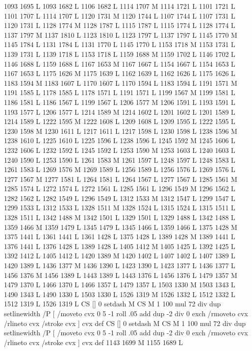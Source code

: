 {{{{{{{{{{{{{{{{{{{{{{{{1093 1695 L
1093 1682 L
1106 1682 L
1114 1707 M 1114 1721 L
1101 1721 L
1101 1707 L
1114 1707 L
1120 1731 M 1120 1744 L
1107 1744 L
1107 1731 L
1120 1731 L
1128 1774 M 1128 1787 L
1115 1787 L
1115 1774 L
1128 1774 L
1137 1797 M 1137 1810 L
1123 1810 L
1123 1797 L
1137 1797 L
1145 1770 M 1145 1784 L
1131 1784 L
1131 1770 L
1145 1770 L
1153 1718 M 1153 1731 L
1139 1731 L
1139 1718 L
1153 1718 L
1159 1688 M 1159 1702 L
1146 1702 L
1146 1688 L
1159 1688 L
1167 1653 M 1167 1667 L
1154 1667 L
1154 1653 L
1167 1653 L
1175 1626 M 1175 1639 L
1162 1639 L
1162 1626 L
1175 1626 L
1183 1594 M 1183 1607 L
1170 1607 L
1170 1594 L
1183 1594 L
1191 1571 M 1191 1585 L
1178 1585 L
1178 1571 L
1191 1571 L
1199 1567 M 1199 1581 L
1186 1581 L
1186 1567 L
1199 1567 L
1206 1577 M 1206 1591 L
1193 1591 L
1193 1577 L
1206 1577 L
1214 1589 M 1214 1602 L
1201 1602 L
1201 1589 L
1214 1589 L
1222 1595 M 1222 1608 L
1209 1608 L
1209 1595 L
1222 1595 L
1230 1598 M 1230 1611 L
1217 1611 L
1217 1598 L
1230 1598 L
1238 1596 M 1238 1610 L
1225 1610 L
1225 1596 L
1238 1596 L
1245 1592 M 1245 1606 L
1232 1606 L
1232 1592 L
1245 1592 L
1253 1590 M 1253 1603 L
1240 1603 L
1240 1590 L
1253 1590 L
1261 1583 M 1261 1597 L
1248 1597 L
1248 1583 L
1261 1583 L
1269 1576 M 1269 1589 L
1256 1589 L
1256 1576 L
1269 1576 L
1277 1567 M 1277 1581 L
1264 1581 L
1264 1567 L
1277 1567 L
1285 1561 M 1285 1574 L
1272 1574 L
1272 1561 L
1285 1561 L
1296 1549 M 1296 1562 L
1282 1562 L
1282 1549 L
1296 1549 L
1312 1533 M 1312 1547 L
1299 1547 L
1299 1533 L
1312 1533 L
1328 1511 M 1328 1524 L
1315 1524 L
1315 1511 L
1328 1511 L
1342 1488 M 1342 1501 L
1329 1501 L
1329 1488 L
1342 1488 L
1359 1466 M 1359 1479 L
1345 1479 L
1345 1466 L
1359 1466 L
1375 1428 M 1375 1441 L
1361 1441 L
1361 1428 L
1375 1428 L
1389 1428 M 1389 1441 L
1376 1441 L
1376 1428 L
1389 1428 L
1405 1412 M 1405 1425 L
1392 1425 L
1392 1412 L
1405 1412 L
1420 1389 M 1420 1402 L
1407 1402 L
1407 1389 L
1420 1389 L
1436 1377 M 1436 1390 L
1423 1390 L
1423 1377 L
1436 1377 L
1456 1376 M 1456 1389 L
1443 1389 L
1443 1376 L
1456 1376 L
1479 1357 M 1479 1370 L
1466 1370 L
1466 1357 L
1479 1357 L
1503 1330 M 1503 1343 L
1490 1343 L
1490 1330 L
1503 1330 L
1526 1319 M 1526 1332 L
1512 1332 L
1512 1319 L
1526 1319 L
CS [] 0 setdash M
CS M 1 100 mul 72 div dup setlinewidth
/P [ /moveto cvx 0 5 -1 roll .05 add dup -2 div 0 exch /rmoveto cvx /rlineto cvx /stroke cvx ] cvx def
CS [] 0 setdash M
CS M 1 100 mul 72 div dup setlinewidth
/P [ /moveto cvx 0 5 -1 roll .05 add dup -2 div 0 exch /rmoveto cvx /rlineto cvx /stroke cvx ] cvx def
1143 1699 M 1155 1689 L
}}}}}}}}}}}}}}}}}}}}}}}}
